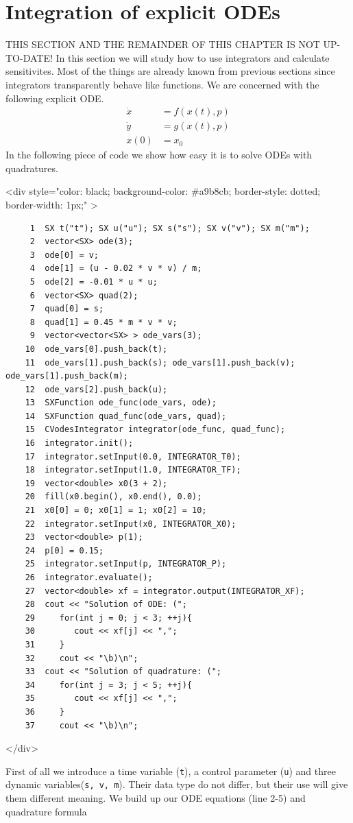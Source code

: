 \documentclass[a4paper,12pt]{book}
\newcommand{\codebegin}{
\begin{rawhtml}
<div style="color: black; background-color: \#a9b8cb;  border-style: dotted; border-width: 1px;" >
\end{rawhtml}
}
\newcommand{\codeend}{
\begin{rawhtml}
</div>
\end{rawhtml}
}
\newcommand{\codebegin}{

}
\newcommand{\codeend}{

}
\begin{document}
{\section{Integration of explicit ODEs}
{\color{red}THIS SECTION AND THE REMAINDER OF THIS CHAPTER IS NOT UP-TO-DATE!}
In this section we will study how to use integrators and calculate sensitivites. Most of the things are already known from previous sections
since integrators transparently behave like functions. We are concerned with the following explicit ODE.
\begin{align}
\dot{x} &= f(x(t), p)\\
\dot{y} &= g(x(t), p)\\
x(0) &= x_0
\end{align}
In the following piece of code we show how easy it is to solve ODEs with quadratures.
\par
\codebegin
\begin{verbatim}
     1  SX t("t"); SX u("u"); SX s("s"); SX v("v"); SX m("m");
     2  vector<SX> ode(3);
     3  ode[0] = v;
     4  ode[1] = (u - 0.02 * v * v) / m;
     5  ode[2] = -0.01 * u * u;
     6  vector<SX> quad(2);
     7  quad[0] = s;
     8  quad[1] = 0.45 * m * v * v;
     9  vector<vector<SX> > ode_vars(3);
    10  ode_vars[0].push_back(t);
    11  ode_vars[1].push_back(s); ode_vars[1].push_back(v); ode_vars[1].push_back(m);
    12  ode_vars[2].push_back(u);
    13  SXFunction ode_func(ode_vars, ode);
    14  SXFunction quad_func(ode_vars, quad);
    15  CVodesIntegrator integrator(ode_func, quad_func);
    16  integrator.init();
    17  integrator.setInput(0.0, INTEGRATOR_T0);
    18  integrator.setInput(1.0, INTEGRATOR_TF);
    19  vector<double> x0(3 + 2);
    20  fill(x0.begin(), x0.end(), 0.0);
    21  x0[0] = 0; x0[1] = 1; x0[2] = 10;
    22  integrator.setInput(x0, INTEGRATOR_X0);
    23  vector<double> p(1);
    24  p[0] = 0.15;
    25  integrator.setInput(p, INTEGRATOR_P);
    26  integrator.evaluate();
    27  vector<double> xf = integrator.output(INTEGRATOR_XF);
    28  cout << "Solution of ODE: (";
    29     for(int j = 0; j < 3; ++j){
    30        cout << xf[j] << ",";
    31     }
    32     cout << "\b)\n";
    33  cout << "Solution of quadrature: (";
    34     for(int j = 3; j < 5; ++j){
    35        cout << xf[j] << ",";
    36     }
    37     cout << "\b)\n";
\end{verbatim}
\codeend
First of all we introduce a time variable (\texttt{t}), a control parameter (\texttt{u}) and three dynamic variables(\texttt{s, v, m}).
Their data type do not differ, but their use will give them different meaning. We build up our ODE equations (line 2-5) and quadrature formula
}
\end{document}
